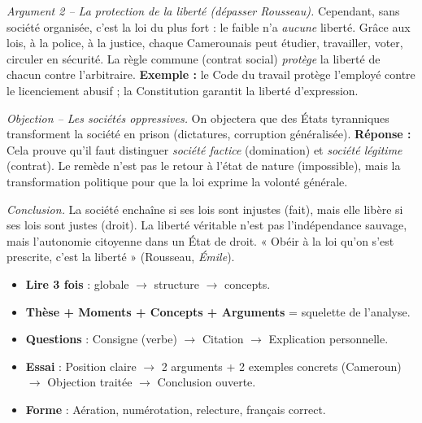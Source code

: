 \documentclass[11pt]{article}
\newcommand{\cle}[1]{{\popxbold\color{popdark}#1}}
\begin{document}
\begin{exoresolu}
\emph{Argument 2 -- La protection de la liberté (dépasser Rousseau).} Cependant, sans société organisée, c'est la loi du plus fort : le faible n'a \emph{aucune} liberté. Grâce aux lois, à la police, à la justice, chaque Camerounais peut étudier, travailler, voter, circuler en sécurité. La règle commune (contrat social) \emph{protège} la liberté de chacun contre l'arbitraire. \textbf{Exemple :} le Code du travail protège l'employé contre le licenciement abusif ; la Constitution garantit la liberté d'expression.

\emph{Objection -- Les sociétés oppressives.} On objectera que des États tyranniques transforment la société en prison (dictatures, corruption généralisée). \textbf{Réponse :} Cela prouve qu'il faut distinguer \emph{société factice} (domination) et \emph{société légitime} (contrat). Le remède n'est pas le retour à l'état de nature (impossible), mais la transformation politique pour que la loi exprime la \cle{volonté générale}.

\emph{Conclusion.} La société enchaîne si ses lois sont injustes (fait), mais elle libère si ses lois sont justes (droit). La liberté véritable n'est pas l'indépendance sauvage, mais l'autonomie citoyenne dans un État de droit. « Obéir à la loi qu'on s'est prescrite, c'est la liberté » (Rousseau, \emph{Émile}).
\end{exoresolu}

\begin{aretenir}
\begin{itemize}
\item \textbf{Lire 3 fois} : globale $\rightarrow$ structure $\rightarrow$ concepts.
\item \textbf{Thèse + Moments + Concepts + Arguments} = squelette de l'analyse.
\item \textbf{Questions} : Consigne (verbe) $\rightarrow$ Citation $\rightarrow$ Explication personnelle.
\item \textbf{Essai} : Position claire $\rightarrow$ 2 arguments + 2 exemples concrets (Cameroun) $\rightarrow$ Objection traitée $\rightarrow$ Conclusion ouverte.
\item \textbf{Forme} : Aération, numérotation, relecture, français correct.
\end{itemize}
\end{aretenir}
\end{document}
